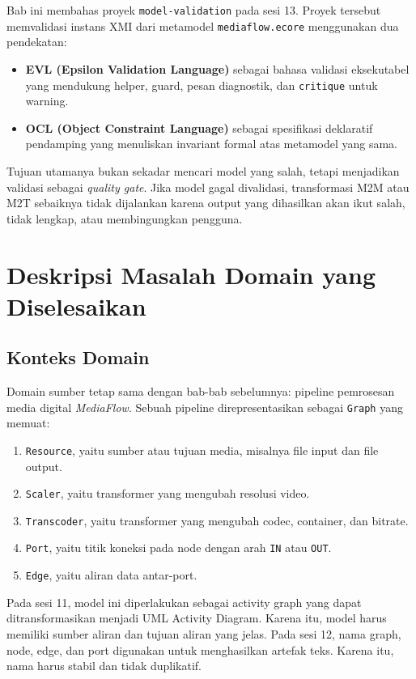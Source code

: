 Bab ini membahas proyek \texttt{model-validation} pada sesi 13. Proyek tersebut memvalidasi instans XMI dari metamodel \texttt{mediaflow.ecore} menggunakan dua pendekatan:
\begin{itemize}
  \item \textbf{EVL (Epsilon Validation Language)} sebagai bahasa validasi eksekutabel yang mendukung helper, guard, pesan diagnostik, dan \texttt{critique} untuk warning.
  \item \textbf{OCL (Object Constraint Language)} sebagai spesifikasi deklaratif pendamping yang menuliskan invariant formal atas metamodel yang sama.
\end{itemize}

Tujuan utamanya bukan sekadar mencari model yang salah, tetapi menjadikan validasi sebagai \textit{quality gate}. Jika model gagal divalidasi, transformasi M2M atau M2T sebaiknya tidak dijalankan karena output yang dihasilkan akan ikut salah, tidak lengkap, atau membingungkan pengguna.

\section{Deskripsi Masalah Domain yang Diselesaikan}

\subsection{Konteks Domain}

Domain sumber tetap sama dengan bab-bab sebelumnya: pipeline pemrosesan media digital \textit{MediaFlow}. Sebuah pipeline direpresentasikan sebagai \texttt{Graph} yang memuat:
\begin{enumerate}
  \item \texttt{Resource}, yaitu sumber atau tujuan media, misalnya file input dan file output.
  \item \texttt{Scaler}, yaitu transformer yang mengubah resolusi video.
  \item \texttt{Transcoder}, yaitu transformer yang mengubah codec, container, dan bitrate.
  \item \texttt{Port}, yaitu titik koneksi pada node dengan arah \texttt{IN} atau \texttt{OUT}.
  \item \texttt{Edge}, yaitu aliran data antar-port.
\end{enumerate}

Pada sesi 11, model ini diperlakukan sebagai activity graph yang dapat ditransformasikan menjadi UML Activity Diagram. Karena itu, model harus memiliki sumber aliran dan tujuan aliran yang jelas. Pada sesi 12, nama graph, node, edge, dan port digunakan untuk menghasilkan artefak teks. Karena itu, nama harus stabil dan tidak duplikatif.

